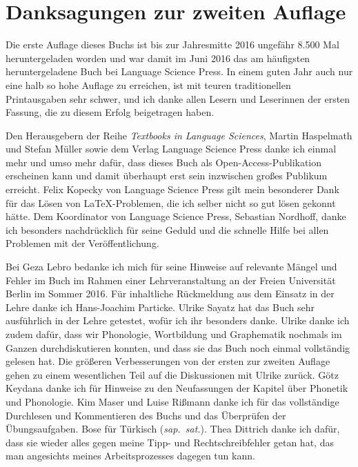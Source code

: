 \section*{Danksagungen zur zweiten Auflage}
\label{sec:danksagungenzurzweitenauflage}

Die erste Auflage dieses Buchs ist bis zur Jahresmitte 2016 ungefähr 8.500 Mal heruntergeladen worden und war damit im Juni 2016 das am häufigsten heruntergeladene Buch bei Language Science Press.
In einem guten Jahr auch nur eine halb so hohe Auflage zu erreichen, ist mit teuren traditionellen Printausgaben sehr schwer, und ich danke allen Lesern und Leserinnen der ersten Fassung, die zu diesem Erfolg beigetragen haben.

Den Herausgebern der Reihe \textit{Textbooks in Language Sciences}, Martin Haspelmath und Stefan Müller sowie dem Verlag Language Science Press danke ich einmal mehr und umso mehr dafür, dass dieses Buch als Open-Access-Publikation erscheinen kann und damit überhaupt erst sein inzwischen großes Publikum erreicht.
Felix Kopecky von Language Science Press gilt mein besonderer Dank für das Lösen von \LaTeX-Problemen, die ich selber nicht so gut lösen gekonnt hätte.
Dem Koordinator von Language Science Press, Sebastian Nordhoff, danke ich besonders nachdrücklich für seine Geduld und die schnelle Hilfe bei allen Problemen mit der Veröffentlichung.

Bei Geza Lebro bedanke ich mich für seine Hinweise auf relevante Mängel und Fehler im Buch im Rahmen einer Lehrveranstaltung an der Freien Universität Berlin im Sommer 2016.
Für inhaltliche Rückmeldung aus dem Einsatz in der Lehre danke ich Hans-Joachim Particke.
Ulrike Sayatz hat das Buch sehr ausführlich in der Lehre getestet, wofür ich ihr besonders danke.
Ulrike danke ich zudem dafür, dass wir Phonologie, Wortbildung und Graphematik nochmals im Ganzen durchdiskutieren konnten, und dass sie das Buch noch einmal vollständig gelesen hat.
Die größeren Verbesserungen von der ersten zur zweiten Auflage gehen zu einem wesentlichen Teil auf die Diskussionen mit Ulrike zurück.
Götz Keydana danke ich für Hinweise zu den Neufassungen der Kapitel über Phonetik und Phonologie.
Kim Maser und Luise Rißmann danke ich für das vollständige Durchlesen und Kommentieren des Buchs und das Überprüfen der Übungsaufgaben.
Bose für Türkisch (\textit{sap.\ sat.}).
Thea Dittrich danke ich dafür, dass sie wieder alles gegen meine Tipp- und Rechtschreibfehler getan hat, das man angesichts meines Arbeitsprozesses dagegen tun kann.


